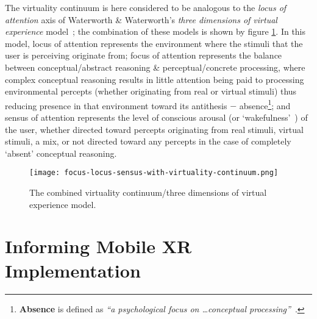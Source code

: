 \newcommand{\absencefootnote}{\footnote{\textbf{Absence} is defined as \textit{``a psychological focus on \ldots conceptual processing''}~\cite{Waterworth2001}.}}

The virtuality continuum is here considered to be analogous to the \textit{locus of attention} axis of Waterworth \& Waterworth's \textit{three dimensions of virtual experience} model~\cite{Waterworth2001}; the combination of these models is shown by figure \ref{focus-locus-sensus-with-virtuality-continuum}. In this model, locus of attention represents the environment where the stimuli that the user is perceiving originate from; focus of attention represents the balance between conceptual/abstract reasoning \& perceptual/concrete processing, where complex conceptual reasoning results in little attention being paid to processing environmental percepts (whether originating from real or virtual stimuli) thus reducing presence\presencefootnote{} in that environment toward its antithesis $-$ absence\absencefootnote{}; and sensus of attention represents the level of conscious arousal (or `wakefulness'~\cite{Laureys2009}) of the user, whether directed toward percepts originating from real stimuli, virtual stimuli, a mix, or not directed toward any percepts in the case of completely `absent' conceptual reasoning.

\begin{figure}[h]
	\begin{center}
		\texttt{[image: focus-locus-sensus-with-virtuality-continuum.png]}
		\caption{The combined virtuality continuum/three dimensions of virtual experience model.}
		\label{focus-locus-sensus-with-virtuality-continuum}
	\end{center}	
\end{figure}





\section{Informing Mobile XR Implementation}

